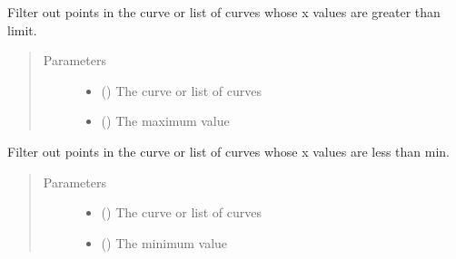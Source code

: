 \documentclass[letterpaper,10pt,english]{sphinxmanual}
\begin{document}
\begin{fulllineitems}
\label{\detokenize{pydv:pydvpy.xmax}}
Filter out points in the curve or list of curves whose x values are greater than limit.
\begin{quote}\begin{description}
\item[{Parameters}] \leavevmode\begin{itemize}
\item {} 
 () \textendash{} The curve or list of curves

\item {} 
 () \textendash{} The maximum value

\end{itemize}

\end{description}\end{quote}

\end{fulllineitems}


\begin{fulllineitems}
\label{\detokenize{pydv:pydvpy.xmin}}
Filter out points in the curve or list of curves whose x values are less than min.
\begin{quote}\begin{description}
\item[{Parameters}] \leavevmode\begin{itemize}
\item {} 
 () \textendash{} The curve or list of curves

\item {} 
 () \textendash{} The minimum value

\end{itemize}

\end{description}\end{quote}

\end{fulllineitems}
\end{document}
